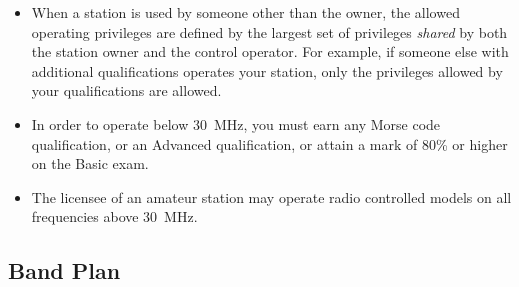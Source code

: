 \documentclass[letterpaper,12pt]{scrartcl}
\begin{document}
\begin{itemize}
\item When a station is used by someone other than the owner, the allowed operating privileges are defined by the largest set of privileges \textit{shared} by both the
station owner and the control operator. For example, if someone else with additional qualifications operates your station, only the privileges allowed by your qualifications are allowed.
\item In order to operate below 30~MHz, you must earn any Morse code qualification, or an Advanced qualification, or attain a mark of 80\% or higher on the Basic exam.
\item The licensee of an amateur station may operate radio controlled models on all frequencies above 30~MHz.
\end{itemize}

\subsection{Band Plan}
\end{document}
